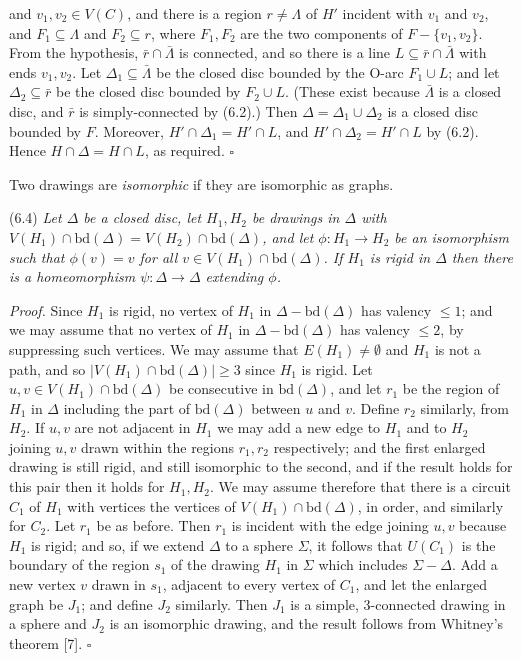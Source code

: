 \noindent and $v_1, v_2 \in V(C)$, and there is a region $r \ne \Lambda$ of $H'$ incident with $v_1$ and $v_2$, and $F_1 \subseteq \Lambda$ and $F_2 \subseteq r$, where $F_1, F_2$ are the two components of $F - \{v_1, v_2\}$. From the hypothesis, $\bar{r} \cap \bar{\Lambda}$ is connected, and so there is a line $L \subseteq \bar{r} \cap \bar{\Lambda}$ with ends $v_1, v_2$. Let $\Delta_1 \subseteq \bar{\Lambda}$ be the closed disc bounded by the O-arc $F_1 \cup L$; and let $\Delta_2 \subseteq \bar{r}$ be the closed disc bounded by $F_2 \cup L$. (These exist because $\bar{\Lambda}$ is a closed disc, and $\bar{r}$ is simply-connected by (6.2).) Then $\Delta = \Delta_1 \cup \Delta_2$ is a closed disc bounded by $F$. Moreover, $H' \cap \Delta_1 = H' \cap L$, and $H' \cap \Delta_2 = H' \cap L$ by (6.2). Hence $H \cap \Delta = H \cap L$, as required. $\square$

Two drawings are \textit{isomorphic} if they are isomorphic as graphs.

\stmt
(6.4) \textit{Let $\Delta$ be a closed disc, let $H_1, H_2$ be drawings in $\Delta$ with $V(H_1) \cap \text{bd}(\Delta) = V(H_2) \cap \text{bd}(\Delta)$, and let $\phi \colon H_1 \to H_2$ be an isomorphism such that $\phi(v) = v$ for all $v \in V(H_1) \cap \text{bd}(\Delta)$. If $H_1$ is rigid in $\Delta$ then there is a homeomorphism $\psi \colon \Delta \to \Delta$ extending $\phi$.}

\textit{Proof.} Since $H_1$ is rigid, no vertex of $H_1$ in $\Delta - \text{bd}(\Delta)$ has valency $\le 1$; and we may assume that no vertex of $H_1$ in $\Delta - \text{bd}(\Delta)$ has valency $\le 2$, by suppressing such vertices. We may assume that $E(H_1) \ne \emptyset$ and $H_1$ is not a path, and so $|V(H_1) \cap \text{bd}(\Delta)| \ge 3$ since $H_1$ is rigid. Let $u, v \in V(H_1) \cap \text{bd}(\Delta)$ be consecutive in $\text{bd}(\Delta)$, and let $r_1$ be the region of $H_1$ in $\Delta$ including the part of $\text{bd}(\Delta)$ between $u$ and $v$. Define $r_2$ similarly, from $H_2$. If $u, v$ are not adjacent in $H_1$ we may add a new edge to $H_1$ and to $H_2$ joining $u, v$ drawn within the regions $r_1, r_2$ respectively; and the first enlarged drawing is still rigid, and still isomorphic to the second, and if the result holds for this pair then it holds for $H_1, H_2$. We may assume therefore that there is a circuit $C_1$ of $H_1$ with vertices the vertices of $V(H_1) \cap \text{bd}(\Delta)$, in order, and similarly for $C_2$. Let $r_1$ be as before. Then $r_1$ is incident with the edge joining $u, v$ because $H_1$ is rigid; and so, if we extend $\Delta$ to a sphere $\Sigma$, it follows that $U(C_1)$ is the boundary of the region $s_1$ of the drawing $H_1$ in $\Sigma$ which includes $\Sigma - \Delta$. Add a new vertex $v$ drawn in $s_1$, adjacent to every vertex of $C_1$, and let the enlarged graph be $J_1$; and define $J_2$ similarly. Then $J_1$ is a simple, 3-connected drawing in a sphere and $J_2$ is an isomorphic drawing, and the result follows from Whitney's theorem [7]. $\square$

